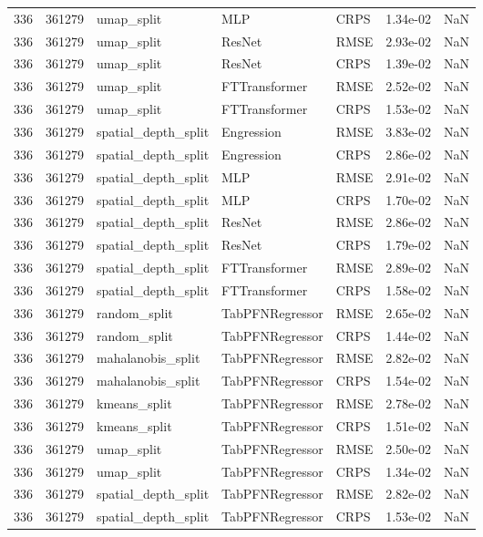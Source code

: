 \begin{tabular}{rrlllrr}
336 & 361279 & umap\_split & MLP & CRPS & 1.34e-02 & NaN \\
336 & 361279 & umap\_split & ResNet & RMSE & 2.93e-02 & NaN \\
336 & 361279 & umap\_split & ResNet & CRPS & 1.39e-02 & NaN \\
336 & 361279 & umap\_split & FTTransformer & RMSE & 2.52e-02 & NaN \\
336 & 361279 & umap\_split & FTTransformer & CRPS & 1.53e-02 & NaN \\
336 & 361279 & spatial\_depth\_split & Engression & RMSE & 3.83e-02 & NaN \\
336 & 361279 & spatial\_depth\_split & Engression & CRPS & 2.86e-02 & NaN \\
336 & 361279 & spatial\_depth\_split & MLP & RMSE & 2.91e-02 & NaN \\
336 & 361279 & spatial\_depth\_split & MLP & CRPS & 1.70e-02 & NaN \\
336 & 361279 & spatial\_depth\_split & ResNet & RMSE & 2.86e-02 & NaN \\
336 & 361279 & spatial\_depth\_split & ResNet & CRPS & 1.79e-02 & NaN \\
336 & 361279 & spatial\_depth\_split & FTTransformer & RMSE & 2.89e-02 & NaN \\
336 & 361279 & spatial\_depth\_split & FTTransformer & CRPS & 1.58e-02 & NaN \\
336 & 361279 & random\_split & TabPFNRegressor & RMSE & 2.65e-02 & NaN \\
336 & 361279 & random\_split & TabPFNRegressor & CRPS & 1.44e-02 & NaN \\
336 & 361279 & mahalanobis\_split & TabPFNRegressor & RMSE & 2.82e-02 & NaN \\
336 & 361279 & mahalanobis\_split & TabPFNRegressor & CRPS & 1.54e-02 & NaN \\
336 & 361279 & kmeans\_split & TabPFNRegressor & RMSE & 2.78e-02 & NaN \\
336 & 361279 & kmeans\_split & TabPFNRegressor & CRPS & 1.51e-02 & NaN \\
336 & 361279 & umap\_split & TabPFNRegressor & RMSE & 2.50e-02 & NaN \\
336 & 361279 & umap\_split & TabPFNRegressor & CRPS & 1.34e-02 & NaN \\
336 & 361279 & spatial\_depth\_split & TabPFNRegressor & RMSE & 2.82e-02 & NaN \\
336 & 361279 & spatial\_depth\_split & TabPFNRegressor & CRPS & 1.53e-02 & NaN \\

\end{tabular}
